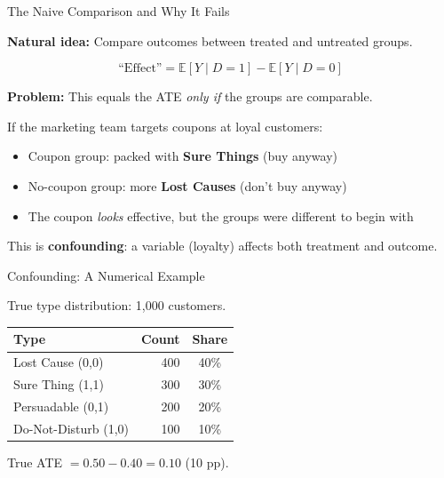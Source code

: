 \documentclass[aspectratio=169, 11pt, handout]{beamer}
\newcommand{\E}{\mathbb{E}}
\begin{document}
\begin{frame}{The Naive Comparison and Why It Fails}

\textbf{Natural idea:} Compare outcomes between treated and untreated groups.

\bigskip

\[
\text{``Effect''} = \E[Y \mid D = 1] - \E[Y \mid D = 0]
\]

\bigskip
\pause

\textbf{Problem:} This equals the ATE \emph{only if} the groups are comparable.

\bigskip

If the marketing team targets coupons at loyal customers:
\begin{itemize}
    \item Coupon group: packed with \textbf{Sure Things} (buy anyway)
    \item No-coupon group: more \textbf{Lost Causes} (don't buy anyway)
    \item The coupon \emph{looks} effective, but the groups were different to begin with
\end{itemize}

\bigskip

This is \textbf{confounding}: a variable (loyalty) affects both treatment and outcome.
\end{frame}

\begin{frame}{Confounding: A Numerical Example}

True type distribution: 1,000 customers.

\begin{center}
\small
\begin{tabular}{lrc}
\toprule
\textbf{Type} & \textbf{Count} & \textbf{Share} \\
\midrule
Lost Cause (0,0) & 400 & 40\% \\
Sure Thing (1,1) & 300 & 30\% \\
Persuadable (0,1) & 200 & 20\% \\
Do-Not-Disturb (1,0) & 100 & 10\% \\
\bottomrule
\end{tabular}
\end{center}

True ATE $= 0.50 - 0.40 = \mathbf{0.10}$ (10 pp).
\end{frame}
\end{document}
